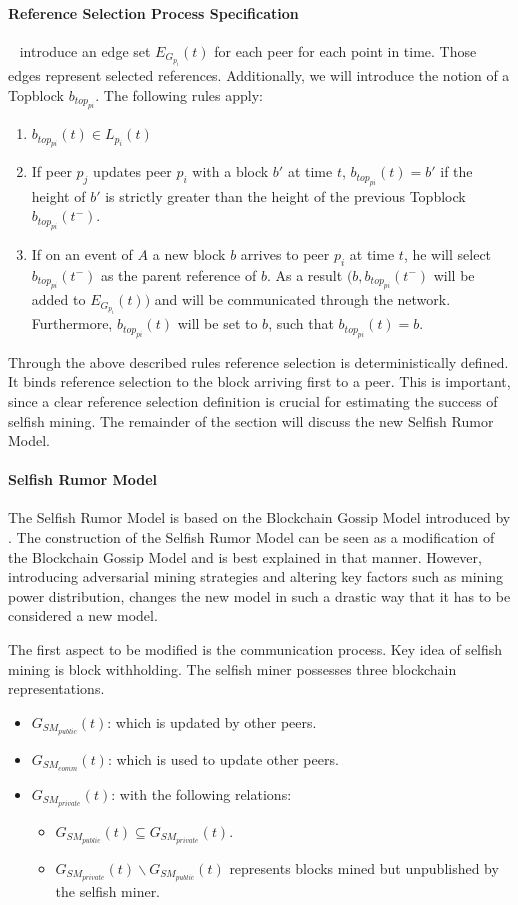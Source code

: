\paragraph{Reference Selection Process Specification}
\gopalan~ introduce an edge set $E_{G_{p_i}}(t)$ for each peer for each point in time. Those edges represent selected references.
Additionally, we will introduce the notion of a Topblock $b_{{top}_{pi}}$.
The following rules apply:
\begin{enumerate}
\item $b_{{top}_{pi}}(t) \in L_{p_i}(t)$
\item If peer $p_j$ updates peer $p_i$ with a block $b'$ at time $t$, $b_{{top}_{pi}}(t) = b'$ if the height of $b'$ is strictly greater than the height of the previous Topblock $b_{{top}_{pi}}(t^-)$.
\item If on an event of $A$ a new block $b$ arrives to peer $p_i$ at time $t$, he will select $b_{{top}_{pi}}(t^-)$ as the parent reference of $b$. As a result $(b,b_{{top}_{pi}}(t^-)$ will be added to $E_{G_{p_i}}(t))$ and will be communicated through the network. Furthermore, $b_{{top}_{pi}}(t)$ will be set to $b$, such that $b_{{top}_{pi}}(t) = b$.
\end{enumerate} 
Through the above described rules reference selection is deterministically defined. It binds reference selection to the block arriving first to a peer. This is important, since a clear reference selection definition is crucial for estimating the success of selfish mining. The remainder of the section will discuss the new Selfish Rumor Model.

\paragraph{Selfish Rumor Model}
The Selfish Rumor Model is based on the Blockchain Gossip Model introduced by \gopalan . The construction of the Selfish Rumor Model can be seen as a modification of the Blockchain Gossip Model and is best explained in that manner. However, introducing adversarial mining strategies and altering key factors such as mining power distribution, changes the new model in such a drastic way that it has to be considered a new model.

The first aspect to be modified is the communication process. 
Key idea of selfish mining is block withholding. The selfish miner possesses three blockchain representations. 
\begin{itemize}
\item $G_{SM_{public}}(t)$: which is updated by other peers.
\item $G_{SM_{comm}}(t)$: which is used to update other peers.
\item $G_{SM_{private}}(t)$: with the following relations:
		\begin{itemize}
		\item $G_{SM_{public}}(t)\subseteq G_{SM_{private}}(t)$.
		\item $G_{SM_{private}}(t)\backslash G_{SM_{public}}(t)$ represents blocks mined but unpublished by the selfish miner.
\end{itemize}		
\end{itemize}


